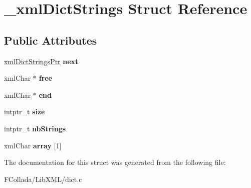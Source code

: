 \hypertarget{struct__xmlDictStrings}{
\section{\_\-xmlDictStrings Struct Reference}
\label{struct__xmlDictStrings}
}
\subsection*{Public Attributes}
\begin{DoxyCompactItemize}
\item 
\hypertarget{struct__xmlDictStrings_a8d15f8ac7e6aa88620d69dce7a7ab4e3}{
\hyperlink{struct__xmlDictStrings}{xmlDictStringsPtr} {\bfseries next}}
\label{struct__xmlDictStrings_a8d15f8ac7e6aa88620d69dce7a7ab4e3}

\item 
\hypertarget{struct__xmlDictStrings_a991acd3dc1c28e78c591f3d9bd0a86e7}{
xmlChar $\ast$ {\bfseries free}}
\label{struct__xmlDictStrings_a991acd3dc1c28e78c591f3d9bd0a86e7}

\item 
\hypertarget{struct__xmlDictStrings_a15b93389226e143fb54d5956fe7c591b}{
xmlChar $\ast$ {\bfseries end}}
\label{struct__xmlDictStrings_a15b93389226e143fb54d5956fe7c591b}

\item 
\hypertarget{struct__xmlDictStrings_a940e722bef8251a1aa6947e481873a02}{
intptr\_\-t {\bfseries size}}
\label{struct__xmlDictStrings_a940e722bef8251a1aa6947e481873a02}

\item 
\hypertarget{struct__xmlDictStrings_aa9b9ff84b1504d96da2a2c2780584dde}{
intptr\_\-t {\bfseries nbStrings}}
\label{struct__xmlDictStrings_aa9b9ff84b1504d96da2a2c2780584dde}

\item 
\hypertarget{struct__xmlDictStrings_a639b7f2b5463316e9a13f34265b1cc2b}{
xmlChar {\bfseries array} \mbox{[}1\mbox{]}}
\label{struct__xmlDictStrings_a639b7f2b5463316e9a13f34265b1cc2b}

\end{DoxyCompactItemize}


The documentation for this struct was generated from the following file:\begin{DoxyCompactItemize}
\item 
FCollada/LibXML/dict.c\end{DoxyCompactItemize}
